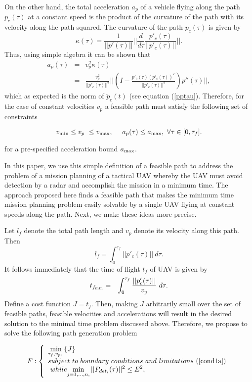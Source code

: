\documentclass[]{aiaa-tc}%
\begin{document}
On the other hand, the total acceleration $a_p$
of a vehicle flying along the path $p_c(\tau)$ at a constant speed is the product of the curvature of
the path with its velocity along the path squared. The curvature of the path $p_c(\tau)$ is given by
\[
\kappa(\tau) = \frac{1}{||p'(\tau)||}
||\frac{d}{d \tau} \frac {p'_c(\tau)}{||p'_c(\tau)||}||.
\]
\noindent Thus, using simple algebra it can be shown that
\begin{eqnarray*}
a_p(\tau) &=& v^2_p \kappa(\tau) \\
    &=&\frac{v_p^2}{||p'_c(\tau)||^2}
||(I - \frac{p'_c(\tau)(p'_c(\tau))^T}{||p'_c(\tau)||^2}) p''(\tau)||,
\end{eqnarray*}
\noindent which as expected is the norm of $\ddot p_c(t)$ (see equation (\ref{pptau}).
Therefore, for the case of constant
velocities $v_p$ a feasible path must satisfy the following set
of constraints

\begin{eqnarray} \label{cond1a}
v_{\rm min} \le v_p ~ \le v_{\rm max}, ~~~~ a_p(\tau) \le a_{\rm max},
~ \forall \tau \in [0,\tau_f].
\end{eqnarray}

\noindent for a pre-specified acceleration bound $a_{\rm max}$.

In this paper, we use this simple definition of a feasible path to address the problem
of a mission planning of a tactical UAV whereby the UAV must avoid detection by a radar
and accomplish the mission in a minimum time.  The approach proposed here finds a
feasible path that makes the minimum time mission planning problem easily solvable by a
single UAV flying at constant speeds along the path. Next, we make these ideas more
precise.

Let $l_{f}$ denote the total path length and $v_{p}$ denote its velocity along this
path. Then
$$
l_{f}=\int^{\tau_{f}}_0 ||p'_{c}(\tau)|| ~ d \tau.
$$
It follows immediately that the time of flight $t_{f}$ of UAV is given by
\begin{eqnarray} \nonumber t_{f_{{\rm min}}} &=&
\int^{\tau_{f}}_0 \frac{||p'_{c}(\tau)||} {v_{{\rm p}}}~ d \tau.
\end{eqnarray}
Define a cost function $J = t_{f}$. Then, making $J$ arbitrarily small over the set of
feasible paths, feasible velocities and accelerations  will result in the desired
solution to the minimal time problem discussed above. Therefore, we propose to solve
the following path generation problem

\begin{eqnarray}
F: \left\{
\begin{array}{llll}
\displaystyle{\min_{\tau_{f},v_{p}, \;} \{ J  \} } \\
subject~to
~boundary~conditions~and~limitations~(\ref{cond1a})\\
~while
\displaystyle{\min_{j = 1, \ldots, n,} ||P_{det_i}(\tau)||^2 \le E^2},
\end{array} \right.
\end{eqnarray}
\end{document}
